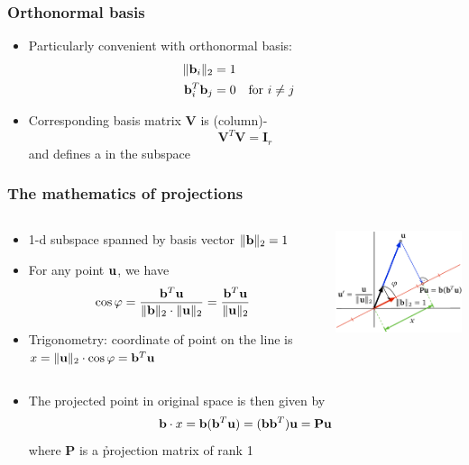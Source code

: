 \documentclass[t]{beamer} %
\begin{document}
\begin{frame}
  \frametitle{Orthonormal basis}

  \begin{itemize}
  \item Particularly convenient with orthonormal basis:
    \begin{align*}
      \norm[2]{\vb_i} &= 1 \\
      \vb_i^T \vb_j &= 0 && \text{for } i\neq j
    \end{align*}
  \item Corresponding basis matrix $\mathbf{V}$ is (column)-
    \[
      \mathbf{V}^T \mathbf{V} = \mathbf{I}_r
    \]
    and defines a  in the subspace
  \end{itemize}
\end{frame}

\begin{frame}
  \frametitle{The mathematics of projections}

  \begin{columns}[c]
    \begin{column}{50mm}
      \begin{itemize}
      \item 1-d subspace spanned by basis vector
        $\norm[2]{\vb} = 1$
      \item For any point $\vu$, we have
        \[
          \cos \varphi
          = \frac{\vb^T \vu}{\norm[2]{\vb}\cdot \norm[2]{\vu}}
          = \frac{\vb^T \vu}{\norm[2]{\vu}}          
        \]
      \item<2-> Trigonometry: coordinate of point on the line is
        $x = \norm[2]{\vu}\cdot \cos\varphi = \vb^T \vu$
      \end{itemize}
    \end{column}
    \begin{column}{50mm}
      \includegraphics[width=50mm]{img/3_cosine_projection}
    \end{column}
  \end{columns}
  
  \begin{itemize}
  \item<3-> The projected point in original space is then given by
    \[
      \vb\cdot x = \vb (\vb^T \vu) = (\vb \vb^T) \vu = \mathbf{P} \vu
    \]
    where $\mathbf{P}$ is a \h{projection matrix} of rank 1
  \end{itemize}
\end{frame}
\end{document}
